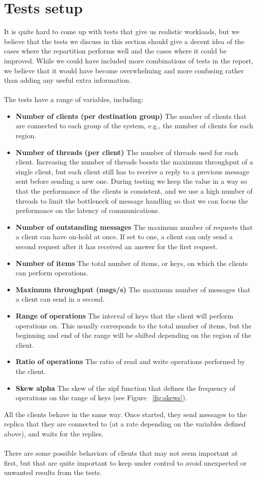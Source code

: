 \section{Tests setup}\label{sec:tests-setup}
It is quite hard to come up with tests that give us realistic workloads, but we believe that the tests we discuss in this section should give a decent idea of the cases where the repartition performs well and the cases where it could be improved. While we could have included more combinations of tests in the report, we believe that it would have become overwhelming and more confusing rather than adding any useful extra information.
\\\\
The tests have a range of variables, including:
\begin{itemize}
  \item \textbf{Number of clients (per destination group)} The number of clients that are connected to each group of the system, e.g., the number of clients for each region.
  \item \textbf{Number of threads (per client)} The number of threads used for each client. Increasing the number of threads boosts the maximum throughput of a single client, but each client still has to receive a reply to a previous message sent before sending a new one. During testing we keep the value in a way so that the performance of the clients is consistent, and we use a high number of threads to limit the bottleneck of message handling so that we can focus the performance on the latency of communications.
  \item \textbf{Number of outstanding messages} The maximum number of requests that a client can have on-hold at once. If set to one, a client can only send a second request after it has received an answer for the first request.
  \item \textbf{Number of items} The total number of items, or keys, on which the clients can perform operations.
  \item \textbf{Maximum throughput (msgs/s)} The maximum number of messages that a client can send in a second.
  \item \textbf{Range of operations} The interval of keys that the client will perform operations on. This usually corresponds to the total number of items, but the beginning and end of the range will be shifted depending on the region of the client.
  \item \textbf{Ratio of operations} The ratio of read and write operations performed by the client.
  \item \textbf{Skew alpha} The skew of the zipf function that defines the frequency of operations on the range of keys (see Figure ~\ref{fig:skews}).
\end{itemize}
All the clients behave in the same way. Once started, they send messages to the replica that they are connected to (at a rate depending on the variables defined above), and waits for the replies.
\\\\
There are some possible behaviors of clients that may not seem important at first, but that are quite important to keep under control to avoid unexpected or unwanted results from the tests.

